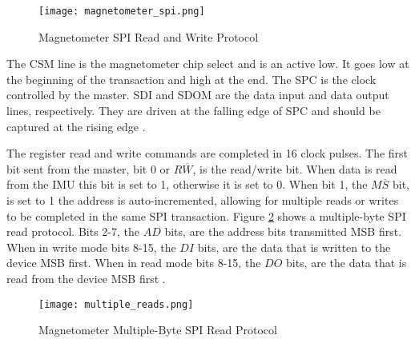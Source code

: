 \begin{figure}[H]
	\centerline{\texttt{[image: magnetometer\_spi.png]}}
	\caption{Magnetometer SPI Read and Write Protocol \cite{lsm9ds1}}
	\label{magnetometer_spi}
\end{figure}

The CS\textunderscore{}M line is the magnetometer chip select and is an active low. It goes low at the beginning of the transaction and high at the end. The SPC is the clock controlled by the master. SDI and SDO\textunderscore{}M are the data input and data output lines, respectively. They are driven at the falling edge of SPC and should be captured at the rising edge \cite{lsm9ds1}.
\par
The register read and write commands are completed in 16 clock pulses. The first bit sent from the master, bit 0 or $R\overline{W}$, is the read/write bit. When data is read from the IMU this bit is set to 1, otherwise it is set to 0. When bit 1, the $M\overline{S}$ bit, is set to 1 the address is auto-incremented, allowing for multiple reads or writes to be completed in the same SPI transaction. Figure \ref{multiple_reads} shows a multiple-byte SPI read protocol. Bits 2-7, the $AD$ bits, are the address bits transmitted MSB first. When in write mode bits 8-15, the $DI$ bits, are the data that is written to the device MSB first. When in read mode bits 8-15, the $DO$ bits, are the data that is read from the device MSB first \cite{lsm9ds1}.

\begin{figure}[H]
	\centerline{\texttt{[image: multiple\_reads.png]}}
	\caption{Magnetometer Multiple-Byte SPI Read Protocol \cite{lsm9ds1}}
	\label{multiple_reads}
\end{figure}

